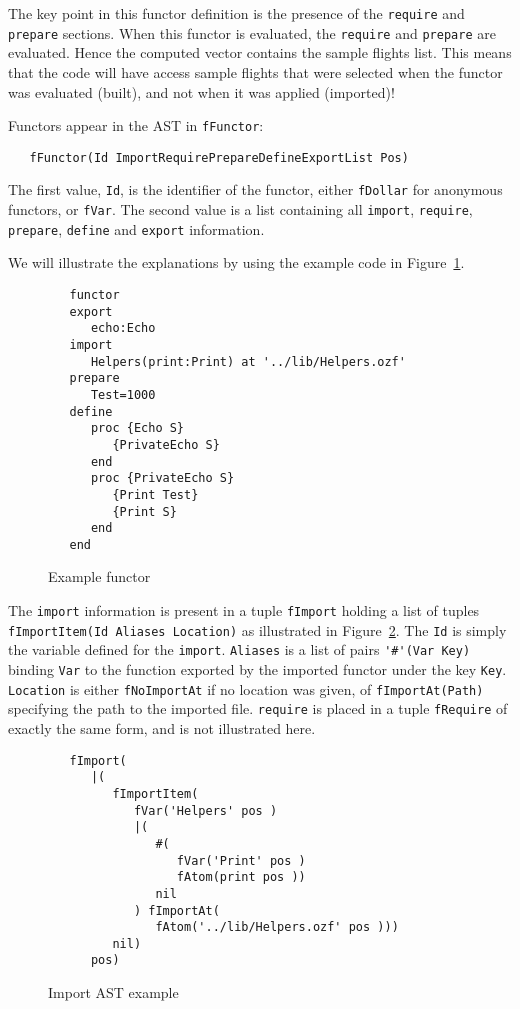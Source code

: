\documentclass[a4paper]{memoir}
\begin{document}
The key point in this functor definition is the presence of the
\lstinline!require! and \lstinline!prepare! sections. When this functor is
evaluated, the \lstinline!require! and \lstinline!prepare! are evaluated.
Hence the computed vector contains the sample flights list.
This means that the code will have access sample flights that were selected when
the functor was evaluated (built), and not when it was applied (imported)!

Functors appear in the AST in \lstinline!fFunctor!:
\begin{lstlisting}
   fFunctor(Id ImportRequirePrepareDefineExportList Pos)
\end{lstlisting}
The first value, \lstinline!Id!, is the identifier of the functor, either
\lstinline!fDollar! for anonymous functors, or \lstinline!fVar!.
The second value is a list containing all \lstinline!import!,
\lstinline!require!, \lstinline!prepare!, \lstinline!define! and
\lstinline!export! information. 

We will illustrate the explanations by using the example code in
Figure~\ref{fig:functor_example_code}.
\begin{figure}[ht]
\begin{lstlisting}
   functor
   export
      echo:Echo
   import
      Helpers(print:Print) at '../lib/Helpers.ozf'
   prepare
      Test=1000
   define
      proc {Echo S}
         {PrivateEcho S}
      end
      proc {PrivateEcho S}
         {Print Test}
         {Print S}
      end
   end
\end{lstlisting}
\caption{Example functor}
\label{fig:functor_example_code}
\end{figure}


The \lstinline!import! information is present in a tuple \lstinline!fImport!
holding a list of tuples \lstinline!fImportItem(Id Aliases Location)! as illustrated in
Figure~\ref{fig:functor_example_import}.
The \lstinline!Id! is simply the variable defined for the \lstinline!import!.
\lstinline!Aliases! is a list of pairs \lstinline!'#'(Var Key)! binding
\lstinline!Var! to the function exported by the imported functor under the key
\lstinline!Key!.
\lstinline!Location! is either \lstinline!fNoImportAt! if no location was given,
of \lstinline!fImportAt(Path)! specifying the path to the imported file.
\lstinline!require! is placed in a tuple \lstinline!fRequire! of exactly the same form, and is not illustrated here.

\begin{figure}[ht]
\begin{lstlisting}
   fImport(
      |(
         fImportItem(
            fVar('Helpers' pos )
            |(
               #(
                  fVar('Print' pos )
                  fAtom(print pos ))
               nil
            ) fImportAt(
               fAtom('../lib/Helpers.ozf' pos )))
         nil)
      pos)
\end{lstlisting}
\caption{Import AST example}
\label{fig:functor_example_import}
\end{figure}
\end{document}
